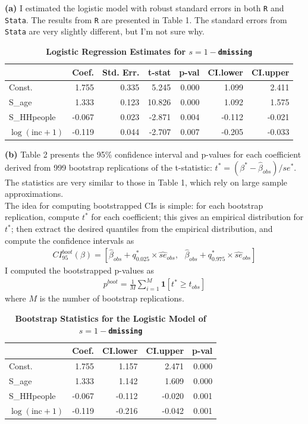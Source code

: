 \documentclass[12pt]{article}
\begin{document}
\textbf{(a)} I estimated the logistic model with robust standard errors in both \verb|R| and \verb|Stata|. The results from \verb|R| are presented in Table 1. The standard errors from \verb|Stata| are very slightly different, but I'm not sure why.

\begin{table}[!htpb]
\centering
\caption{\textbf{Logistic Regression Estimates for $s=1-$\texttt{dmissing}}}
\begin{tabular}{lrrrrrr}
  \hline
 & Coef. & Std. Err. & t-stat & p-val & CI.lower & CI.upper \\ 
  \hline
Const. & 1.755 & 0.335 & 5.245 & 0.000 & 1.099 & 2.411 \\ 
  S\_age & 1.333 & 0.123 & 10.826 & 0.000 & 1.092 & 1.575 \\ 
  S\_HHpeople & -0.067 & 0.023 & -2.871 & 0.004 & -0.112 & -0.021 \\ 
  $\log(\text{inc}+1)$ & -0.119 & 0.044 & -2.707 & 0.007 & -0.205 & -0.033 \\ 
   \hline
\end{tabular}
\end{table}

\textbf{(b)} Table 2 presents the 95\% confidence interval and p-values for each coefficient derived from 999 bootstrap replications of the t-statistic: $t^*=({\beta^*}-\hat{\beta}_{obs})/se^*$. The statistics are very similar to those in Table 1, which rely on large sample approximations. \\

The idea for computing bootstrapped CIs is simple: for each bootstrap replication, compute $t^*$ for each coefficient; this gives an empirical distribution for $t^*$; then extract the desired quantiles from the empirical distribution, and compute the confidence intervals as
\begin{align*}
CI^{boot}_{95}(\beta) = \left[ \hat{\beta}_{obs} +q^*_{0.025}\times \hat{se}_{obs},\text{ } \hat{\beta}_{obs} +q^*_{0.975}\times \hat{se}_{obs} \right]
\end{align*}
I computed the bootstrapped p-values as 
\begin{align*}
p^{boot} = \frac{1}{M}\sum_{i=1}^M \bm{1}[t^* \geq t_{obs}]
\end{align*}
where $M$ is the number of bootstrap replications.

\begin{table}[!htpb]
\centering
\caption{\textbf{Bootstrap Statistics for the Logistic Model of $s=1-$\texttt{dmissing}}}
\begin{tabular}{lrrrr}
  \hline
 & Coef. & CI.lower & CI.upper & p-val \\ 
  \hline
Const. & 1.755 & 1.157 & 2.471 & 0.000 \\ 
  S\_age & 1.333 & 1.142 & 1.609 & 0.000 \\ 
  S\_HHpeople & -0.067 & -0.112 & -0.020 & 0.001 \\ 
  $\log(\text{inc}+1)$  & -0.119 & -0.216 & -0.042 & 0.001 \\ 
   \hline
\end{tabular}
\end{table}
\end{document}
